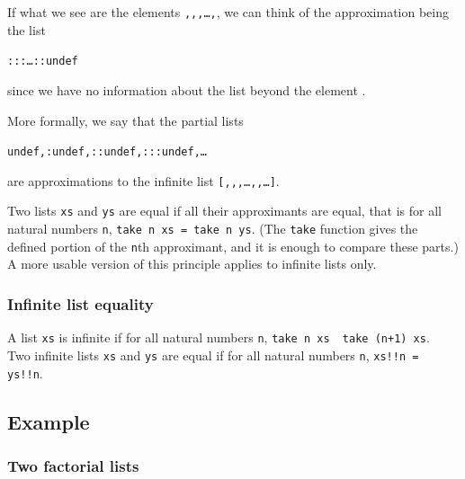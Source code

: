 If what we see are the elements 
\texttt{,,,\ldots,}, we can think
of the approximation being the list
\begin{alltt}
:::\ldots::undef
\end{alltt}
since we have no information about the list beyond the element 
\texttt{}.

More formally, we say that the partial lists
\begin{alltt}
undef, :undef, ::undef, :::undef, \ldots
\end{alltt}
are approximations to the infinite list 
\texttt{[,,,\ldots,,\ldots]}. 

Two lists \texttt{xs} and \texttt{ys} are equal if all their
approximants are equal, that is for all natural numbers \texttt{n},
\texttt{take n xs = take n ys}.
(The \texttt{take} function gives the defined portion of the \texttt{n}th
approximant, and it is enough to compare these parts.) A more usable
version of this principle applies to infinite lists only.

\subsubsection*{Infinite list equality}
A list \texttt{xs} is infinite if for all natural numbers
\texttt{n}, \texttt{take n xs
\noteq\ take (n+1) xs}.\\
Two infinite lists \texttt{xs} and \texttt{ys} are equal if for all natural
numbers \texttt{n},
\texttt{xs!!n = ys!!n}.

\subsection*{Example}
\subsubsection*{Two factorial lists}

